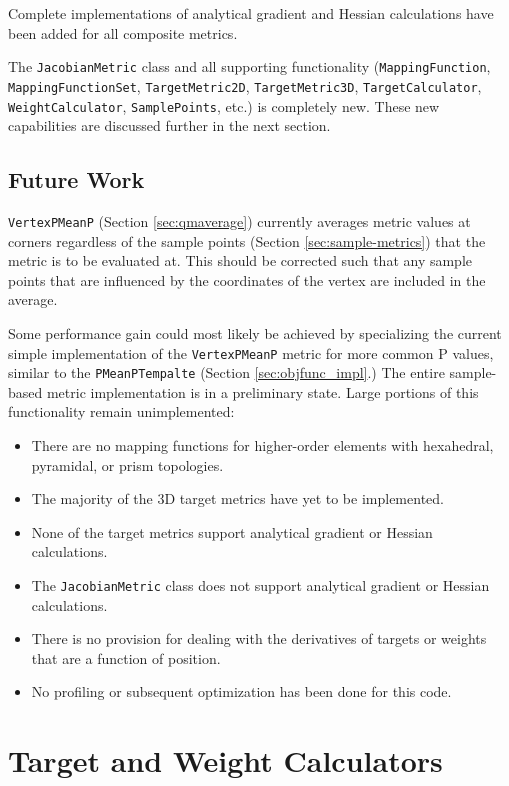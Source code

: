 \documentclass{article}
\begin{document}
Complete implementations of analytical gradient and Hessian calculations have been added for all composite metrics.

The \texttt{JacobianMetric} class and all supporting functionality (\texttt{MappingFunction}, \texttt{MappingFunctionSet}, \texttt{TargetMetric2D}, \texttt{TargetMetric3D}, \texttt{TargetCalculator}, \texttt{WeightCalculator},
\texttt{SamplePoints}, etc.) is completely new.  These new capabilities are discussed further in the next section.


\subsection{Future Work}

 \texttt{VertexPMeanP} (Section \ref{sec:qmaverage}) currently averages metric values at corners regardless of the sample points (Section \ref{sec:sample-metrics}) that the metric is to be evaluated at.  This should be corrected such that any sample points that are influenced by the coordinates of the vertex are included in the average.

Some performance gain could most likely be achieved by specializing the current simple implementation of the \texttt{VertexPMeanP} metric for more common P values, similar to the \texttt{PMeanPTempalte} (Section \ref{sec:objfunc_impl}.)
The entire sample-based metric implementation is in a preliminary state.  Large portions of this functionality remain unimplemented:
\begin{itemize}
\item There are no mapping functions for higher-order elements with hexahedral, pyramidal, or prism topologies.
\item The majority of the 3D target metrics have yet to be implemented.
\item None of the target metrics support analytical gradient or Hessian calculations.
\item The \texttt{JacobianMetric} class does not support analytical gradient or Hessian calculations.
\item There is no provision for dealing with the derivatives of targets or weights that are a function of position.
\item No profiling or subsequent optimization has been done for this code.
\end{itemize}

\section{Target and Weight Calculators}
\end{document}
